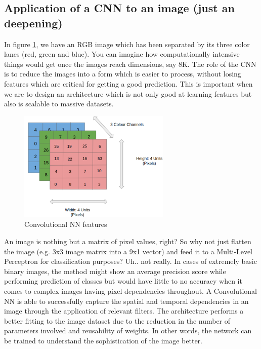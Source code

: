 \documentclass[12pt]{report}
\theoremstyle{plain}
\begin{document}
\begin{flushleft}
\section{Application of a CNN to an image (just an deepening)}
In figure \ref{fig:convNN_image_scheme}, we have an RGB image which has been separated by its three color lanes (red, green and blue). You can imagine how computationally intensive things would get once the images reach dimensions, say 8K. The role of the CNN is to reduce the images into a form which is easier to process, without losing features which are critical for getting a good prediction. This is important when we are to design an architecture which is not only good at learning features but also is scalable to massive datasets.\\
\begin{figure}[!h]
	\centering
	\includegraphics[scale=1.5]{images/convNN_image_scheme.pdf}
	\caption{Convolutional NN features}
	\label{fig:convNN_image_scheme}	
\end{figure}
An image is nothing but a matrix of pixel values, right? So why not just flatten the image (e.g. 3x3 image matrix into a 9x1 vector) and feed it to a Multi-Level Perceptron for classification purposes? Uh.. not really. In cases of extremely basic binary images, the method might show an average precision score while performing prediction of classes but would have little to no accuracy when it comes to complex images having pixel dependencies throughout. A Convolutional NN is able to successfully capture the spatial and temporal dependencies in an image through the application of relevant filters. The architecture performs a better fitting to the image dataset due to the reduction in the number of parameters involved and reusability of weights. In other words, the network can be trained to understand the sophistication of the image better.\\


\end{flushleft}
\end{document}
